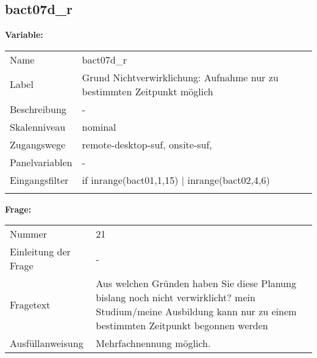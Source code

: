 	
	
	\subsection{bact07d\_r}
	\label{subSection:bact07d_r}

	\noindent\textbf{Variable:}\\
		\begin{tabular}{lL{11.3cm}}
			\label{tableVariable:bact07d_r}
			Name & bact07d\_r \\
			Label & Grund Nichtverwirklichung: Aufnahme nur zu bestimmten Zeitpunkt möglich \\
			Beschreibung & - \\
			Skalenniveau & nominal \\
			Zugangswege &
				remote-desktop-suf,
				onsite-suf,
 \\
			Panelvariablen & -
			 \\
			Eingangsfilter & if inrange(bact01,1,15) | inrange(bact02,4,6) \\
 \\
		\end{tabular}

		\vspace*{1 cm}
		\noindent\textbf{Frage:}\\
		\begin{tabular}{lL{11.3cm}}
			\label{tableQuestion:bact07d_r}
			Nummer & 21 \\
			Einleitung der Frage & - \\
			Fragetext & Aus welchen Gründen haben Sie diese Planung bislang noch nicht verwirklicht?
mein Studium/meine Ausbildung kann nur zu einem bestimmten Zeitpunkt begonnen werden \\
			Ausfüllanweisung & Mehrfachnennung möglich. \\
		\end{tabular}





